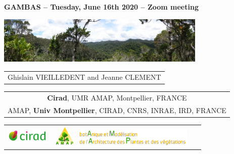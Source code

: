 {
  \begin{frame}
    \begin{center}
        \small{\textbf{GAMBAS -- Tuesday, June 16th 2020 -- Zoom meeting}}
    \end{center}
    \vspace{-0.5cm}
    \titlepage %
    \vspace{-2.5cm}
    \begin{center}
      \includegraphics[width=10cm]{figs/Banniere.png}
    \end{center}
    \begin{center}

        \begin{tabular}{c}
          Ghislain VIEILLEDENT and 
          Jeanne CLEMENT
        \end{tabular}

      \vspace{0.25cm}

        \begin{tabular}{c}
          \textbf{Cirad}, UMR AMAP, Montpellier, FRANCE\\
          AMAP, \textbf{Univ Montpellier}, CIRAD, CNRS, INRAE, IRD, FRANCE
        \end{tabular}

      \vspace{0.25cm}

      \begin{tabular}{C{2cm}C{2cm}C{3cm}}
        \includegraphics[height=0.7cm]{figs/logo_Cirad.png} &
        \includegraphics[height=1cm]{figs/logo_AMAP.png} 
        \includegraphics[height=0.8cm]{figs/AMAP-titre-long.png} &
        ~
      \end{tabular}

    \end{center}

  \end{frame}
}
\setcounter{framenumber}{0}

